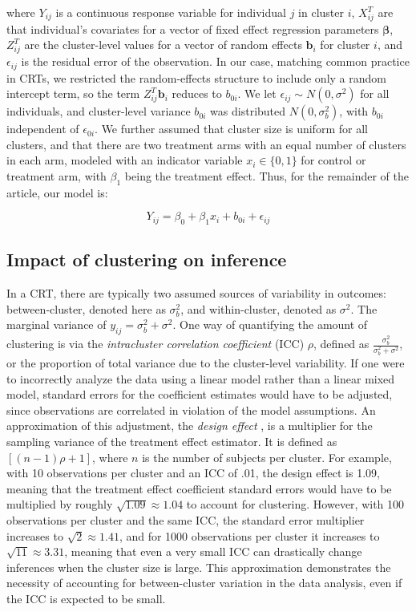 \documentclass[twocolumn]{bmcart}%
\begin{document}
where $Y_{ij}$ is a continuous response variable for individual $j$ in cluster $i$, $X_{ij}^T$ are that individual's covariates for a vector of fixed effect regression parameters $\boldsymbol{\beta}$, $Z_{ij}^T$ are the cluster-level values for a vector of random effects $\boldsymbol{b}_i$ for cluster $i$, and $\epsilon_{ij}$ is the residual error of the observation. In our case, matching common practice in CRTs, we restricted the random-effects structure to include only a random intercept term, so the term $Z_{ij}^T \boldsymbol{b}_i$ reduces to $b_{0i}$. We let $\epsilon_{ij} \sim N(0, \sigma^2)$ for all individuals, and cluster-level variance $b_{0i}$ was distributed $N(0, \sigma_b^2)$, with $b_{0i}$ independent of $\epsilon _{0i}$. We further assumed that cluster size is uniform for all clusters, and that there are two treatment arms with an equal number of clusters in each arm, modeled with an indicator variable $x_{i}\in \{0,1\}$ for control or treatment arm, with $\beta_1$ being the treatment effect. Thus, for the remainder of the article, our model is:

\begin{equation}
  \label{eq:2}
  Y_{ij} = \beta_0 + \beta_1 x_{i} + b_{0i} + \epsilon_{ij}
\end{equation}


\subsection*{Impact of clustering on inference}

In a CRT, there are typically two assumed sources of variability in outcomes: between-cluster, denoted here as $\sigma^2_b$, and within-cluster, denoted as $\sigma^2$. The marginal variance of $y_{ij} = \sigma_b^2 + \sigma^2$. One way of quantifying the amount of clustering is via the \textit{intracluster correlation coefficient} (ICC) $\rho$, defined as $\frac{\sigma^2_b}{\sigma^2_b + \sigma^2}$, or the proportion of total variance due to the cluster-level variability. If one were to incorrectly analyze the data using a linear model rather than a linear mixed model, standard errors for the coefficient estimates would have to be adjusted, since observations are correlated 
in violation of the model assumptions. An approximation of this adjustment, the \textit{design effect} \cite{kish_survey_1965}, is a multiplier for the sampling variance of the treatment effect estimator. It is defined as $[(n-1)\rho + 1]$, where $n$ is the number of subjects per cluster. For example, with 10 observations per cluster and an ICC of .01, the design effect is 1.09, meaning that the treatment effect coefficient standard errors would have to be multiplied by roughly $\sqrt{1.09} \approx 1.04$ to account for clustering. However, with 100 observations per cluster and the same ICC, the standard error multiplier increases to $\sqrt{2} \approx 1.41$, and for 1000 observations per cluster it increases to $\sqrt{11} \approx 3.31$, meaning that even a very small ICC can drastically change inferences when the cluster size is large. This approximation demonstrates the necessity of accounting for between-cluster variation in the data analysis, even if the ICC is expected to be small.
\end{document}

